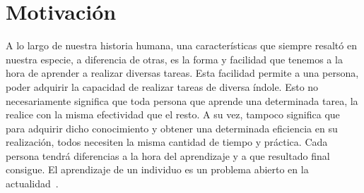 \documentclass[11pt,twoside, spanish]{report} %
\begin{document}



\vspace{-1cm}
%
%

%
%
%
\thispagestyle{plain}
\pagestyle{plain}






\section{Motivaci\'on}

A lo largo de nuestra historia humana, una caracter\'isticas que siempre resalt\'o en nuestra especie, a diferencia de otras, es la forma y facilidad que tenemos a la hora de aprender a realizar diversas tareas.
Esta facilidad permite a una persona, poder adquirir la capacidad de realizar tareas de diversa \'indole.
Esto no necesariamente significa que toda persona que aprende una determinada tarea, la realice con la misma efectividad que el resto.
A su vez, tampoco significa que para adquirir dicho conocimiento y obtener una determinada eficiencia en su realizaci\'on, todos necesiten la misma cantidad de tiempo y pr\'actica.
Cada persona tendr\'a diferencias a la hora del aprendizaje y a que resultado final consigue.
El aprendizaje de un individuo es un problema abierto en la actualidad~\cite{beheim2014-strategicSocialLearning, derex2015-foundationsOfTheHumanCulturalNiche, gariepy2014-neuroSocialLearning, glowacki2017-subsistenceStyleShapeSocialLearningStrategies}.
\end{document}
